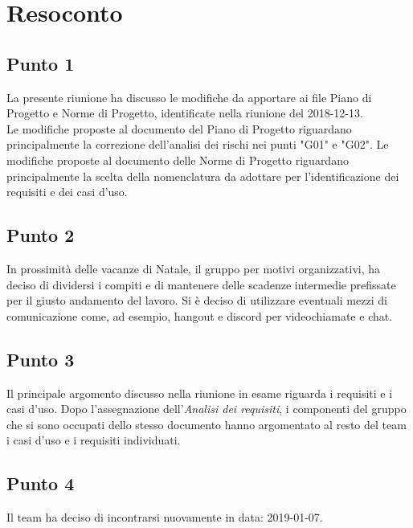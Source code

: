 \section{Resoconto}

\subsection{Punto 1}
La presente riunione ha discusso le modifiche da apportare ai file Piano di Progetto e Norme di Progetto, identificate nella riunione del 2018-12-13.\\
Le modifiche proposte al documento del Piano di Progetto riguardano principalmente la correzione dell'analisi dei rischi nei punti "G01" e "G02". 
Le modifiche proposte al documento delle Norme di Progetto riguardano principalmente la scelta della nomenclatura da adottare per l'identificazione dei requisiti e dei casi d'uso.

\subsection{Punto 2}
In prossimità delle vacanze di Natale, il gruppo per motivi organizzativi, ha deciso di dividersi i compiti e di mantenere delle scadenze intermedie prefissate per il giusto andamento del lavoro. Si è deciso di utilizzare eventuali mezzi di comunicazione come, ad esempio, hangout e discord per videochiamate e chat.

\subsection{Punto 3}
Il principale argomento discusso nella riunione in esame riguarda i requisiti e i casi d'uso. Dopo l'assegnazione dell'\textit{Analisi dei requisiti}, i componenti del gruppo che si sono occupati dello stesso documento hanno argomentato al resto del team i casi d'uso e i requisiti individuati.

\subsection{Punto 4}
Il team ha deciso di incontrarsi nuovamente in data: 2019-01-07.
